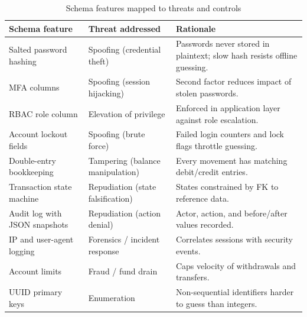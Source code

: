 \begin{table}[htbp]
  \centering
  \caption{Schema features mapped to threats and controls}
  \label{tab:schema-security}
  \small
  \setlength{\tabcolsep}{5pt}
  \renewcommand{\arraystretch}{1.2}
  \begin{tabularx}{\textwidth}{@{} >{\raggedright\arraybackslash}p{3.8cm} >{\raggedright\arraybackslash}p{3.5cm} X @{}}
    \toprule
    \textbf{Schema feature} & \textbf{Threat addressed} & \textbf{Rationale} \\
    \midrule
    Salted password hashing       & Spoofing (credential theft)     & Passwords never stored in plaintext; slow hash resists offline guessing. \\
    MFA columns                   & Spoofing (session hijacking)    & Second factor reduces impact of stolen passwords. \\
    RBAC role column              & Elevation of privilege           & Enforced in application layer against role escalation. \\
    Account lockout fields        & Spoofing (brute force)          & Failed login counters and lock flags throttle guessing. \\
    Double-entry bookkeeping      & Tampering (balance manipulation)& Every movement has matching debit/credit entries. \\
    Transaction state machine     & Repudiation (state falsification)& States constrained by FK to reference data. \\
    Audit log with JSON snapshots & Repudiation (action denial)     & Actor, action, and before/after values recorded. \\
    IP and user-agent logging     & Forensics / incident response   & Correlates sessions with security events. \\
    Account limits                & Fraud / fund drain              & Caps velocity of withdrawals and transfers. \\
    UUID primary keys             & Enumeration                     & Non-sequential identifiers harder to guess than integers. \\
    \bottomrule
  \end{tabularx}
\end{table}
